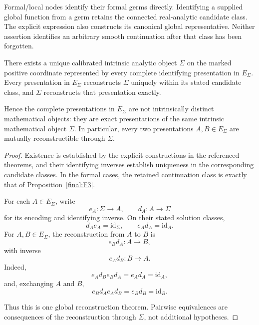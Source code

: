 Formal/local nodes identify their formal germs directly. Identifying a
supplied global function from a germ retains the connected real-analytic
candidate class. The explicit expression also constructs its canonical
global representative. Neither assertion identifies an arbitrary smooth
continuation after that class has been forgotten.

\begin{theorem}
\label{final:global-A}
\label{final:global-B}

There exists a unique calibrated intrinsic analytic object $\Sigma$ on the
marked positive coordinate represented by every complete identifying
presentation in $E_\Sigma$. Every presentation in $E_\Sigma$ reconstructs
$\Sigma$ uniquely within its stated candidate class, and $\Sigma$
reconstructs that presentation exactly.

Hence the complete presentations in $E_\Sigma$ are not intrinsically
distinct mathematical objects: they are exact presentations of the same
intrinsic mathematical object $\Sigma$. In particular, every two
presentations $A,B\in E_\Sigma$ are mutually reconstructible through
$\Sigma$.
\end{theorem}

\begin{proof}
Existence is established by the explicit constructions in the referenced
theorems, and their identifying inverses establish uniqueness in the
corresponding candidate classes. In the formal cases, the retained
continuation class is exactly that of Proposition~\ref{final:F3}.

For each $A\in E_\Sigma$, write
\[
e_A:\Sigma\longrightarrow A,
\qquad
d_A:A\longrightarrow\Sigma
\]
for its encoding and identifying inverse. On their stated solution classes,
\[
d_Ae_A=\mathrm{id}_\Sigma,
\qquad
e_Ad_A=\mathrm{id}_A.
\]
For $A,B\in E_\Sigma$, the reconstruction from $A$ to $B$ is
\[
e_Bd_A:A\longrightarrow B,
\]
with inverse
\[
e_Ad_B:B\longrightarrow A.
\]
Indeed,
\[
e_Ad_Be_Bd_A
=
e_Ad_A
=
\mathrm{id}_A,
\]
and, exchanging $A$ and $B$,
\[
e_Bd_Ae_Ad_B
=
e_Bd_B
=
\mathrm{id}_B.
\]

Thus this is one global reconstruction theorem. Pairwise equivalences are
consequences of the reconstruction through $\Sigma$, not additional
hypotheses.
\end{proof}

